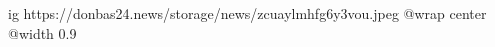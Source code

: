  
 
 
 
 

\ifcmt
  ig https://donbas24.news/storage/news/zcuaylmhfg6y3vou.jpeg
  @wrap center
  @width 0.9
\fi
